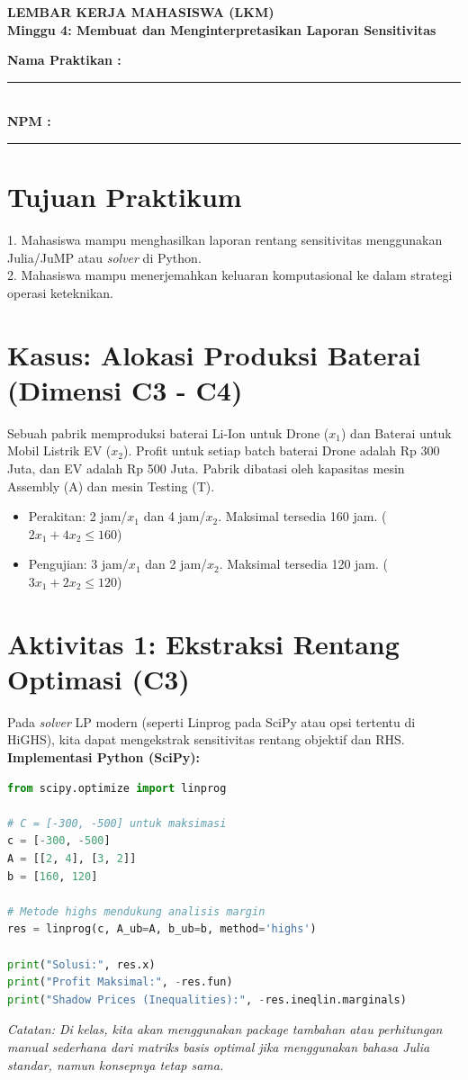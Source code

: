 \documentclass[11pt, a4paper]{article}
\begin{document}
\begin{center}
    \Large\color{UNIBBlue}\textbf{LEMBAR KERJA MAHASISWA (LKM)}\\
    \large\textbf{Minggu 4: Membuat dan Menginterpretasikan Laporan Sensitivitas}
\end{center}

\vspace{0.5cm}
\textbf{Nama Praktikan :} \rule{6cm}{0.4pt} \\
\textbf{NPM :} \rule{6.8cm}{0.4pt}

\section*{Tujuan Praktikum}
1. Mahasiswa mampu menghasilkan laporan rentang sensitivitas menggunakan Julia/JuMP atau \textit{solver} di Python. \\
2. Mahasiswa mampu menerjemahkan keluaran komputasional ke dalam strategi operasi keteknikan.

\section*{Kasus: Alokasi Produksi Baterai (Dimensi C3 - C4)}
Sebuah pabrik memproduksi baterai Li-Ion untuk Drone ($x_1$) dan Baterai untuk Mobil Listrik EV ($x_2$). Profit untuk setiap batch baterai Drone adalah Rp 300 Juta, dan EV adalah Rp 500 Juta. Pabrik dibatasi oleh kapasitas mesin Assembly (A) dan mesin Testing (T).
\begin{itemize}
    \item Perakitan: 2 jam/$x_1$ dan 4 jam/$x_2$. Maksimal tersedia 160 jam. ($2x_1 + 4x_2 \le 160$)
    \item Pengujian: 3 jam/$x_1$ dan 2 jam/$x_2$. Maksimal tersedia 120 jam. ($3x_1 + 2x_2 \le 120$)
\end{itemize}

\section*{Aktivitas 1: Ekstraksi Rentang Optimasi (C3)}
Pada \textit{solver} LP modern (seperti Linprog pada SciPy atau opsi tertentu di HiGHS), kita dapat mengekstrak sensitivitas rentang objektif dan RHS.
\textbf{Implementasi Python (SciPy):}
\begin{lstlisting}[language=Python]
from scipy.optimize import linprog

# C = [-300, -500] untuk maksimasi
c = [-300, -500]
A = [[2, 4], [3, 2]]
b = [160, 120]

# Metode highs mendukung analisis margin
res = linprog(c, A_ub=A, b_ub=b, method='highs')

print("Solusi:", res.x)
print("Profit Maksimal:", -res.fun)
print("Shadow Prices (Inequalities):", -res.ineqlin.marginals)
\end{lstlisting}
\textit{Catatan: Di kelas, kita akan menggunakan \textit{package} tambahan atau perhitungan manual sederhana dari matriks basis optimal jika menggunakan bahasa Julia standar, namun konsepnya tetap sama.}
\end{document}
